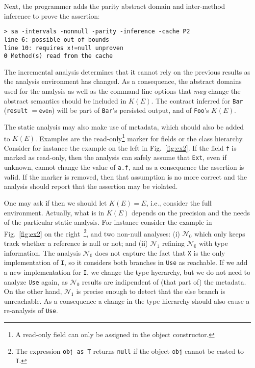 \documentclass{llncs}
\newcommand{\code}[1]{\lstinline{#1}}
\begin{document}
Next, the programmer adds the parity abstract domain and inter-method inference  to prove the assertion:
\begin{lstlisting}
> sa -intervals -nonnull -parity -inference -cache P2 
line 6: possible out of bounds
line 10: requires x!=null unproven
0 Method(s) read from the cache
\end{lstlisting}
The incremental analysis determines that it cannot rely on the previous results as the analysis environment has changed.
As a consequence, the abstract domains used for the analysis as well as the command line options that \emph{may} change the abstract semantics  should  be included in $K(E)$.
The contract inferred for \code{Bar} (\code{result} $= \mathsf{even}$) will be part of \code{Bar}'s persisted output, and of \code{Foo}'s $K(E)$.

The static analysis may also make use of  metadata, which should also be added to $K(E)$.
Examples are the read-only\footnote{A read-only field can only be assigned in the object constructor.} marker for fields or the class hierarchy.
Consider for instance the example on the left in Fig.~\ref{fig:ex2}.
If the field \code{f} is marked as read-only, then the analysis can safely assume that \code{Ext}, even if unknown, cannot change the value of \code{a.f}, and as a consequence  the assertion is valid.
If the marker is removed, then that assumption is no more correct and the analysis should report that the assertion may be violated.

One may ask if then we should let $K(E) = E$, i.e., consider the full environment.
Actually, what is in $K(E)$ depends on the precision and the needs of the particular static analysis.
For instance consider the example in Fig.~\ref{fig:ex2} on the right~\footnote{The expression \code{obj as T} returns \code{null} if the object \code{obj} cannot be casted to \code{T}.}, and two non-null analyses: (i) $\mathcal{N_0}$ which only keeps track whether a reference is null or not; and (ii) $\mathcal{N}_1$ refining  $\mathcal{N}_0$ with type information.
The analysis $\mathcal{N}_0$ does not capture the fact that \code{X} is the only implementation of \code{I}, so it considers both branches in \code{Use} as reachable.
If we add a new implementation for \code{I}, we change the type hyerarchy, but we do not need to analyze \code{Use} again, as $\mathcal{N_0}$ results are indipendent of (that part of) the metadata.
On the other hand,   $\mathcal{N}_1$ is precise enough to detect that the else branch is unreachable.
As a consequence a change in the type hierarchy should also cause a re-analysis of \code{Use}. 
\end{document}
